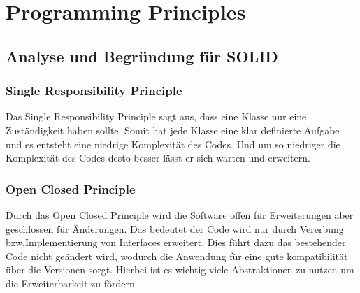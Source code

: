 \chapter{Programming Principles}
\section{Analyse und Begründung für SOLID}

\subsection{Single Responsibility Principle}
Das Single Responsibility Principle sagt aus, dass eine Klasse nur eine Zuständigkeit haben sollte.
Somit hat jede Klasse eine klar definierte Aufgabe und es entsteht eine niedrige Komplexität des Codes.
Und um so niedriger die Komplexität des Codes desto besser lässt er sich warten und erweitern.


\subsection{Open Closed Principle}
Durch das Open Closed Principle wird die Software offen für Erweiterungen aber geschlossen für Änderungen.
Das bedeutet der Code wird nur durch Vererbung bzw.Implementierung von Interfaces erweitert.
Dies führt dazu das bestehender Code nicht geändert wird, wodurch die Anwendung für eine gute kompatibilität über die Versionen sorgt.
Hierbei ist es wichtig viele Abstraktionen zu nutzen um die Erweiterbarkeit zu fördern.

